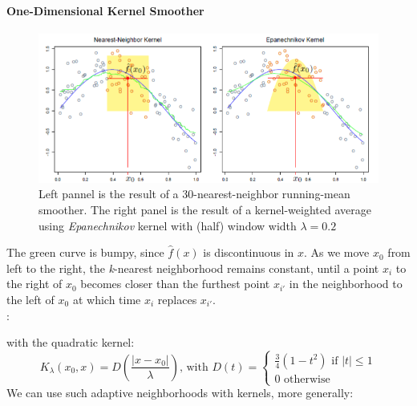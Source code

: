 \paragraph{One-Dimensional Kernel Smoother }
\begin{figure}[H]
	\begin{center}
		\includegraphics[width=\textwidth]{./chap/1chap/3sec/8images/40_localReg.PNG}
	\end{center}
	\caption{Left pannel is the result of a 30-nearest-neighbor running-mean smoother. The
	right panel is the result of a kernel-weighted average using \textit{Epanechnikov} kernel
	with (half) window width $\lambda=0.2$}
	\label{fig:40_localReg.PNG}
\end{figure}
The green curve is bumpy, since $\hat{f}(x)$ is discontinuous in $x$. As we move $x_{0}$ from left
to the right, the \emph{k}-nearest neighborhood remains constant, until a point $x_{i}$ to the right
of $x_{0}$ becomes closer than the furthest point $x_{i'}$ in the neighborhood to the left of 
$x_{0}$ at which time $x_{i}$ replaces $x_{i'}$.\\
:
\begin{center}
\end{center}
with the  quadratic kernel:
$$ K_{\lambda}(x_{0}, x)=D\left(\dfrac{|x-x_{0}|}{\lambda}\right)\text{, with }D(t)=
\begin{cases}
	\frac{3}{4}(1-t^{2})\text{ if }|t|\leq 1\\
	0\text{ otherwise}
\end{cases}
$$
We can use such adaptive neighborhoods with kernels, more generally: 
\begin{center}
\end{center}

